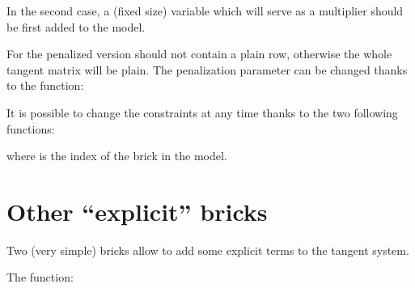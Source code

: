 \documentclass[a4paper,11pt,english]{sphinxmanual}
\begin{document}
In the second case, a (fixed size) variable which will serve as a multiplier
should be first added to the model.

For the penalized version  should not contain a plain row, otherwise the
whole tangent matrix will be plain. The penalization parameter can be changed
thanks to the function:

\begin{sphinxVerbatim}[commandchars=\\\{\}]
  
\end{sphinxVerbatim}

It is possible to change the constraints at any time thanks to the two following
functions:

\begin{sphinxVerbatim}[commandchars=\\\{\}]
  
  
\end{sphinxVerbatim}

where  is the index of the brick in the model.

\ignorespaces 

\section{Other “explicit” bricks}
\label{\detokenize{userdoc/model_explicit:other-explicit-bricks}}\label{\detokenize{userdoc/model_explicit:ud-model-explicit}}\label{\detokenize{userdoc/model_explicit:index-0}}\label{\detokenize{userdoc/model_explicit::doc}}
Two (very simple) bricks allow to add some explicit terms to the tangent system.

The function:

\begin{sphinxVerbatim}[commandchars=\\\{\}]
     
                                         
                                         
\end{sphinxVerbatim}
\end{document}

